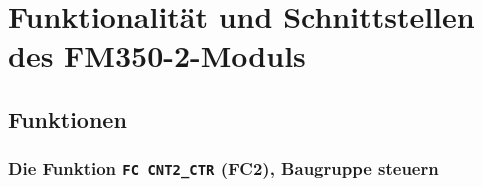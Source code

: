 
\section{Funktionalität und Schnittstellen des FM350-2-Moduls}

\subsection{Funktionen}

\subsubsection{Die Funktion \texttt{FC CNT2\_CTR} (FC2), Baugruppe steuern}

